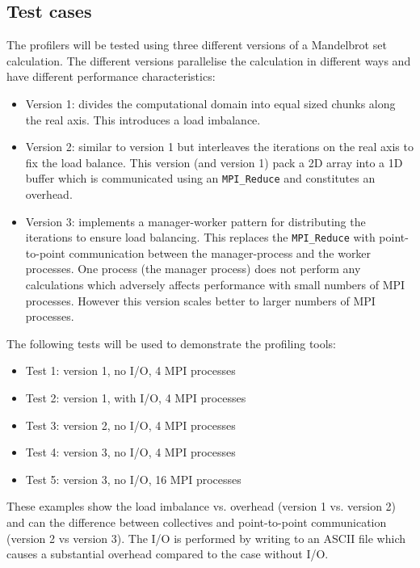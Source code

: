 \documentclass[a4paper,titlepage]{article}
\begin{document}

\subsection{Test cases}

The profilers will be tested using three different versions of a Mandelbrot set calculation. The different versions parallelise the calculation in different ways and have different performance characteristics:
\begin{itemize}
\item Version 1: divides the computational domain into equal sized chunks along the real axis. This introduces a load imbalance.
\item Version 2: similar to version 1 but interleaves the iterations on the real axis to fix the load balance. This version (and version 1) pack a 2D array into a 1D buffer which is communicated using an \verb+MPI_Reduce+ and constitutes an overhead.
\item Version 3: implements a manager-worker pattern for distributing the iterations to ensure load balancing. This replaces the \verb+MPI_Reduce+ with point-to-point communication between the manager-process and the worker processes. One process (the manager process) does not perform any calculations which adversely affects performance with small numbers of MPI processes. However this version scales better to larger numbers of MPI processes.
\end{itemize}

The following tests will be used to demonstrate the profiling tools:
\begin{itemize}
\item Test 1: version 1, no I/O, 4 MPI processes
\item Test 2: version 1, with I/O, 4 MPI processes
\item Test 3: version 2, no I/O, 4 MPI processes
\item Test 4: version 3, no I/O, 4 MPI processes
\item Test 5: version 3, no I/O, 16 MPI processes 
\end{itemize}
These examples show the load imbalance vs. overhead (version 1 vs. version 2) and can the difference between collectives and point-to-point communication (version 2 vs version 3). The I/O is performed by writing to an ASCII file which causes a substantial overhead compared to the case without I/O.
\end{document}
